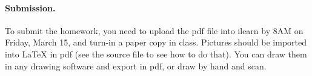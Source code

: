 \documentclass{article}
\begin{document}



\vskip 0.1in
\paragraph{Submission.}
To submit the homework, you need to upload the pdf file into ilearn by 8AM on Friday, March 15,
and turn-in a paper copy in class.
Pictures should be 
imported into {\LaTeX} in pdf (see the source file to see
how to do that). You can draw them in any drawing
software and export in pdf, or draw by hand and scan.
\end{document}
